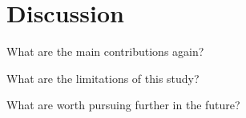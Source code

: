 \documentclass[12pt]{article}
\begin{document}
\section{Discussion}
\label{sec:disc}

What are the main contributions again?

What are the limitations of this study?

What are worth pursuing further in the future?





\end{document}
